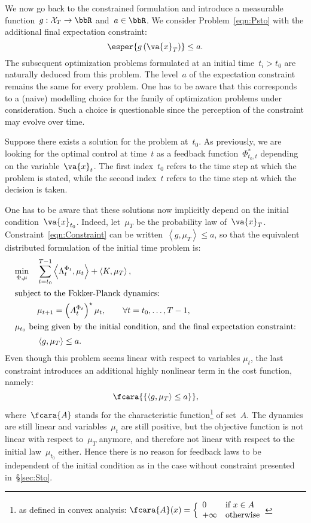 \documentclass[a4paper]{amsart}
\theoremstyle{plain}
\theoremstyle{definition}
\theoremstyle{remark}
\begin{document}
We now go back to the constrained formulation and introduce a
measurable function~$g: \mathcal{X}_T \rightarrow \bbR$ and~$a \in
\bbR$. We consider Problem~\eqref{eqn:Psto} with the additional
final expectation constraint:
\begin{equation*}
    \esper{g\left(\va{x}_T\right)} \leq a.
\end{equation*}
The subsequent optimization problems formulated at an initial
time~$t_{i}>t_{0}$ are naturally deduced from this problem. The
level~$a$ of the expectation constraint remains the same for every
problem. One has to be aware that this corresponds to a (naive)
modelling choice for the family of optimization problems under
consideration. Such a choice is questionable since the perception
of the constraint may evolve over time.

Suppose there exists a solution for the problem at~$t_{0}$. As
previously, we are looking for the optimal control at time~$t$ as
a feedback function~$\Phi_{t_0, t}^*$ depending on the
variable~$\va{x}_{t}$. The first index~$t_{0}$ refers to the time
step at which the problem is stated, while the second index~$t$
refers to the time step at which the decision is taken.

One has to be aware that these solutions now implicitly depend on
the initial condition~$\va{x}_{t_{0}}$. Indeed, let~$\mu_T$ be the
probability law of~$\va{x}_T$. Constraint~\eqref{eqn:Constraint}
can be written~$\left\langle g, \mu_T \right\rangle \leq a$, so
that the equivalent distributed formulation of the initial time
problem is:
\begin{align*}
\min_{\Phi, \mu} \quad
    & \sum_{t=t_0}^{T-1}
      \left\langle \Lambda_t^{\Phi_t}, \mu_t \right\rangle +
      \left\langle K, \mu_T \right\rangle, \\
\intertext{subject to the Fokker-Planck dynamics:}
    & \mu_{t+1} = \left(A_t^{\Phi_t}\right)^\star \mu_t,
      \qquad \forall t=t_0, \dots, T-1,\\
\intertext{$\mu_{t_0}$ being given by the initial condition, and
the final expectation constraint:}
    & \left\langle g, \mu_T \right\rangle \leq a.
\end{align*}
Even though this problem seems linear with respect to variables
$\mu_{t}$, the last constraint introduces an additional highly
nonlinear term in the cost function, namely:
\begin{equation*}
\fcara{\left\{\left\langle g,\mu_T \right\rangle \leq a \right\}},
\end{equation*}
where~$\fcara{A}$ stands for the characteristic
function\footnote{as defined in convex analysis: $\fcara{A}(x) =
\Big\{\begin{array}{ll} 0 & \text{if } x \in A \\ +\infty &
\text{otherwise} \end{array}$} of set~$A$. The dynamics are still
linear and variables~$\mu_t$ are still positive, but the objective
function is not linear with respect to~$\mu_T$ anymore, and
therefore not linear with respect to the initial law~$\mu_{t_0}$
either. Hence there is no reason for feedback laws to be
independent of the initial condition as in the case without
constraint presented in~\S\ref{sec:Sto}.
\end{document}
